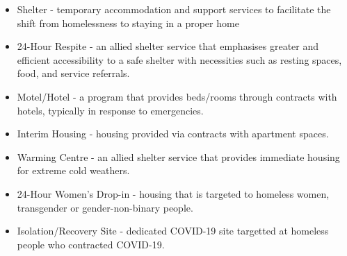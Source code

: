 \documentclass[
  letterpaper,
  DIV=11,
  numbers=noendperiod]{scrartcl}
\providecommand{\tightlist}{%
  \setlength{\itemsep}{0pt}\setlength{\parskip}{0pt}}\usepackage{longtable,booktabs,array}
\begin{document}
\begin{itemize}
\tightlist
\item
  Shelter - temporary accommodation and support services to facilitate
  the shift from homelessness to staying in a proper home
\item
  24-Hour Respite - an allied shelter service that emphasises greater
  and efficient accessibility to a safe shelter with necessities such as
  resting spaces, food, and service referrals.
\item
  Motel/Hotel - a program that provides beds/rooms through contracts
  with hotels, typically in response to emergencies.
\item
  Interim Housing - housing provided via contracts with apartment
  spaces.
\item
  Warming Centre - an allied shelter service that provides immediate
  housing for extreme cold weathers.
\item
  24-Hour Women's Drop-in - housing that is targeted to homeless women,
  transgender or gender-non-binary people.
\item
  Isolation/Recovery Site - dedicated COVID-19 site targetted at
  homeless people who contracted COVID-19.
\end{itemize}
\end{document}
